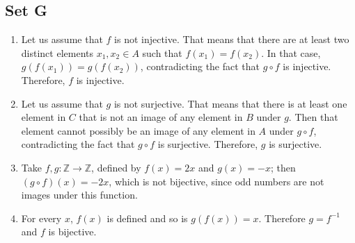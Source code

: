 \documentclass{article}
\begin{document}
\subsection{Set G}
\begin{enumerate}
    \item Let us assume that $f$ is not injective. That means that there are at least two distinct elements $x_1, x_2 \in A$ such that $f(x_1) = f(x_2)$. In that case, $g(f(x_1)) = g(f(x_2))$, contradicting the fact that $g \circ f$ is injective. Therefore, $f$ is injective.

    \item Let us assume that $g$ is not surjective. That means that there is at least one element in $C$ that is not an image of any element in $B$ under $g$. Then that element cannot possibly be an image of any element in $A$ under $g \circ f$, contradicting the fact that $g \circ f$ is surjective. Therefore, $g$ is surjective.

    \item Take $f, g: \mathbb{Z} \to \mathbb{Z}$, defined by $f(x) = 2x$ and $g(x) = -x$; then $(g \circ f)(x) = -2x$, which is not bijective, since odd numbers are not images under this function.

    \item For every $x$, $f(x)$ is defined and so is $g(f(x)) = x$. Therefore $g = f^{-1}$ and $f$ is bijective.
\end{enumerate}
\end{document}
